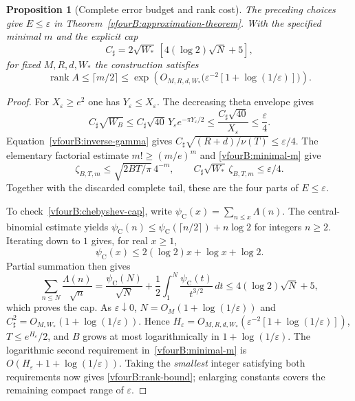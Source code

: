 \documentclass[11pt,a4paper]{article}
\numberwithin{equation}{section}
\newtheorem{proposition}[theorem]{Proposition}
\theoremstyle{definition}\newtheorem{definition}[theorem]{Definition}
\theoremstyle{remark}\newtheorem{remark}[theorem]{Remark}
\newcommand{\rank}{\operatorname{rank}}\newcommand{\ess}{\operatorname{ess}}\newcommand{\supp}{\operatorname{supp}}
\begin{document}
\begin{proposition}[Complete error budget and rank cost]
\label{vfourB:rank-schedule}
The preceding choices give $E\le\varepsilon$ in
Theorem~\ref{vfourB:approximation-theorem}. With the specified minimal $m$
and the explicit cap
\begin{equation}\label{vfourB:chebyshev-cap}
 C_\sharp=2\sqrt{W_*}\,[4(\log2)\sqrt N+5],
\end{equation}
for fixed $M,R,d,W_*$ the construction satisfies
\begin{equation}\label{vfourB:rank-bound}
 \rank A\le\lceil m/2\rceil
 \le\exp\!\left(O_{M,R,d,W_*}
       \bigl(\varepsilon^{-2}[1+\log(1/\varepsilon)]\bigr)\right).
\end{equation}
\end{proposition}
\begin{proof}
For $X_\varepsilon\ge e^2$ one has
$Y_\varepsilon\le X_\varepsilon$. The decreasing theta envelope gives
\[
 C_\sharp\sqrt{W_B}
 \le C_\sharp\sqrt{40}\,Y_\varepsilon
                  e^{-\pi Y_\varepsilon/2}
 \le\frac{C_\sharp\sqrt{40}}{X_\varepsilon}
 \le\frac{\varepsilon}{4}.
\]
Equation~\eqref{vfourB:inverse-gamma} gives
$C_\sharp\sqrt{(R+d)/\nu(T)}\le\varepsilon/4$.
The elementary factorial estimate $m!\ge(m/e)^m$ and
\eqref{vfourB:minimal-m} give
\[
 \zeta_{B,T,m}\le\sqrt{2BT/\pi}\,4^{-m},\qquad
 C_\sharp\sqrt{W_*}\,\zeta_{B,T,m}\le\varepsilon/4.
\]
Together with the discarded complete tail, these are the four parts of
$E\le\varepsilon$.

To check~\eqref{vfourB:chebyshev-cap}, write
$\psi_{\mathrm C}(x)=\sum_{n\le x}\Lambda(n)$.
The central-binomial estimate yields
$\psi_{\mathrm C}(n)\le\psi_{\mathrm C}(\lceil n/2\rceil)+n\log2$
for integers $n\ge2$. Iterating down to $1$ gives, for real $x\ge1$,
\[
 \psi_{\mathrm C}(x)\le2(\log2)x+\log x+\log2.
\]
Partial summation then gives
\[
 \sum_{n\le N}\frac{\Lambda(n)}{\sqrt n}
 =\frac{\psi_{\mathrm C}(N)}{\sqrt N}
   +\frac12\int_1^N\frac{\psi_{\mathrm C}(t)}{t^{3/2}}\,dt
 \le4(\log2)\sqrt N+5,
\]
which proves the cap. As $\varepsilon\downarrow0$,
$N=O_M(1+\log(1/\varepsilon))$ and
$C_\sharp^2=O_{M,W_*}(1+\log(1/\varepsilon))$.
Hence
$H_\varepsilon=O_{M,R,d,W_*}
(\varepsilon^{-2}[1+\log(1/\varepsilon)])$,
$T\le e^{H_\varepsilon}/2$, and $B$ grows at most logarithmically in
$1+\log(1/\varepsilon)$. The logarithmic second requirement
in~\eqref{vfourB:minimal-m} is $O(H_\varepsilon+1+\log(1/\varepsilon))$.
Taking the \emph{smallest} integer satisfying both requirements now gives
\eqref{vfourB:rank-bound}; enlarging constants covers the remaining compact
range of $\varepsilon$.
\end{proof}
\end{document}
